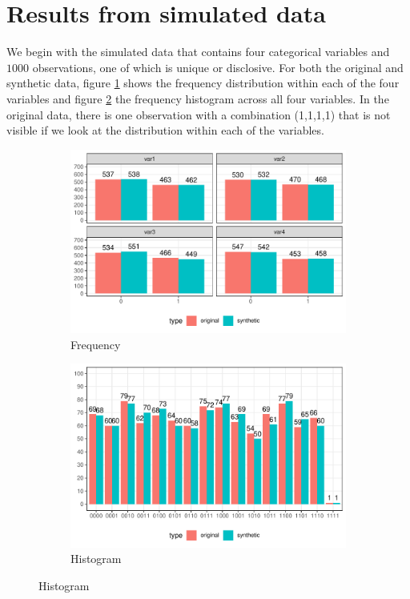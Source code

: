 \documentclass[a4paper,11pt]{style/uneceart}
\begin{document}
\section{Results from simulated data}\label{sec:results}

We begin with the simulated data that contains four categorical variables and $1000$ observations, one of which is unique or disclosive. For both the original and synthetic data, figure \ref{fig:frequency_compare} shows the frequency distribution within each of the four variables and figure \ref{fig:histogram_compare} the frequency histogram across all four variables.  In the original data, there is one observation with a combination (1,1,1,1) that is not visible if we look at the distribution within each of the variables.  

\begin{figure}[!h]
    \centering
    \caption{Compare original and synthetic data}
    \begin{subfigure}{0.48\textwidth}
        \includegraphics[width=\textwidth]{../../graphs/graph_cart_frequency_compare.pdf}
        \caption{Frequency}
        \label{fig:frequency_compare}
    \end{subfigure}
    \hfill
    \begin{subfigure}{0.48\textwidth}
        \includegraphics[width=\textwidth]{../../graphs/graph_cart_histogram_compare.pdf}
        \caption{Histogram}
        \label{fig:histogram_compare}
    \end{subfigure}
    \label{fig:compare}
\end{figure}
\end{document}
